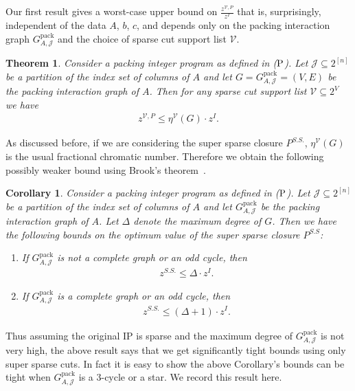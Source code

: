 \documentclass[smallextended]{svjour3}
\newtheorem{theorem}[proposition]{Theorem}
\newtheorem{corollary}[proposition]{Corollary}
\begin{document}
Our first result gives a worst-case upper bound on $\frac{z^{\mathcal{V}, P}}{z^I}$ that is, surprisingly, independent of the data $A$, $b$, $c$, and depends only on the packing interaction graph ${G^{\textrm{pack}}_{A, {\mathcal{J}}}}$ and the choice of sparse cut support list $\mathcal{V}$.

\begin{theorem}\label{thm:packing}
	Consider a packing integer program as defined in ($\textup{P}$). Let $\mathcal{J} \subseteq 2^{[n]}$ be a partition of the index
set of columns of $A$ and let $G = {G^{\textrm{pack}}_{A, {\mathcal{J}}}} = (V,E)$ be the packing interaction graph of $A$. Then for any sparse cut support list ${\mathcal{V}} \subseteq 2^V$ we have
\begin{eqnarray*}
z^{\mathcal{V}, P} \leq \eta^{\mathcal{V}}(G) \cdot z^I.
\end{eqnarray*}
\end{theorem}

As discussed before, if we are considering the super sparse closure $P^{S.S.}$, $\eta^{\mathcal{V}}(G)$ is the usual fractional chromatic number. Therefore we obtain the following possibly weaker bound using Brook's theorem~\cite{brooks41}.

\begin{corollary}\label{cor:brooks}
	Consider a packing integer program as defined in ($\textup{P}$). Let $\mathcal{J} \subseteq 2^{[n]}$ be a partition of the index
set of columns of $A$ and let ${G^{\textrm{pack}}_{A, {\mathcal{J}}}}$ be the packing interaction graph of $A$. Let $\Delta$ denote the maximum degree of $G$. Then we have the following bounds on the optimum value of the super sparse closure $P^{S.S}$:
\begin{enumerate}
\item If ${G^{\textrm{pack}}_{A, {\mathcal{J}}}}$ is not a complete graph or an odd cycle, then
\begin{eqnarray*}
z^{S.S.} \leq \Delta \cdot z^I.
\end{eqnarray*}
\item If ${G^{\textrm{pack}}_{A, {\mathcal{J}}}}$ is a complete graph or an odd cycle, then
\begin{eqnarray*}
z^{S.S.} \leq (\Delta + 1) \cdot  z^I.
\end{eqnarray*}
\end{enumerate}
\end{corollary}

Thus assuming the original IP is sparse and the maximum degree of ${G^{\textrm{pack}}_{A, {\mathcal{J}}}}$ is not very high, the above result says that we get significantly tight bounds using only super sparse cuts. In fact it is easy to show the above Corollary's bounds can be tight when ${G^{\textrm{pack}}_{A, {\mathcal{J}}}}$ is a 3-cycle or a star. We record this result here.
\end{document}
